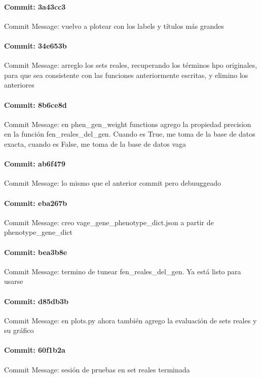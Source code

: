 \documentclass{article}
\begin{document}
\paragraph{Commit: 3a43cc3}
Commit Message: vuelvo a plotear con los labels y títulos más grandes

\paragraph{Commit: 34e653b}
Commit Message: arreglo los sets reales, recuperando los términos hpo originales, para que sea consistente con las funciones anteriormente escritas, y elimino los anteriores

\paragraph{Commit: 8b6ce8d}
Commit Message: en phen_gen_weight functions agrego la propiedad precision en la función fen_reales_del_gen. Cuando es True, me toma de la base de datos exacta, cuando es False, me toma de la base de datos vaga

\paragraph{Commit: ab6f479}
Commit Message: lo mismo que el anterior commit pero debuuggeado

\paragraph{Commit: eba267b}
Commit Message: creo vage_gene_phenotype_dict.json a partir de phenotype_gene_dict

\paragraph{Commit: bea3b8e}
Commit Message: termino de tunear fen_reales_del_gen. Ya está listo para usarse

\paragraph{Commit: d85db3b}
Commit Message: en plots.py ahora también agrego la evaluación de sets reales y su gráfico

\paragraph{Commit: 60f1b2a}
Commit Message: sesión de pruebas en set reales terminada
\end{document}
